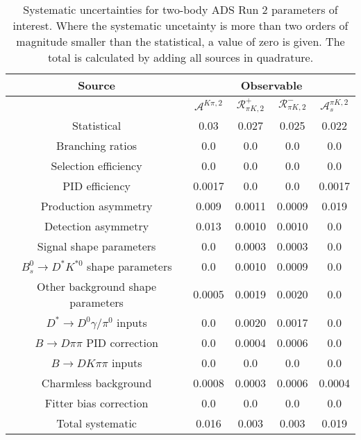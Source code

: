 \begin{sidewaystable}
  \centering
  \begin{tabular}{ccccc}
      \toprule
      Source & \multicolumn{4}{c}{Observable} \\
      \midrule
       & $\mathcal{A}^{K\pi,2}$ & $\mathcal{R}_{\pi K,2}^+$ & $\mathcal{R}_{\pi K,2}^-$ & $\mathcal{A}_s^{\pi K,2}$ \\
      \midrule
      Statistical & 0.03 & 0.027 & 0.025 & 0.022 \\
      \midrule
      Branching ratios & 0.0  & 0.0  & 0.0  & 0.0  \\
      Selection efficiency & 0.0  & 0.0  & 0.0  & 0.0  \\
      PID efficiency & 0.0017 & 0.0  & 0.0  & 0.0017 \\
      Production asymmetry & 0.009 & 0.0011 & 0.0009 & 0.019 \\
      Detection asymmetry & 0.013 & 0.0010 & 0.0010 & 0.0  \\
      Signal shape parameters & 0.0  & 0.0003 & 0.0003 & 0.0  \\
      $B^0_s \to D^* K^{*0}$ shape parameters & 0.0  & 0.0010 & 0.0009 & 0.0  \\
      Other background shape parameters & 0.0005 & 0.0019 & 0.0020 & 0.0  \\
      $D^* \to D^0 \gamma/\pi^0$ inputs & 0.0  & 0.0020 & 0.0017 & 0.0  \\
      $B\to D\pi\pi$ PID correction & 0.0  & 0.0004 & 0.0006 & 0.0  \\
      $B\to DK\pi\pi$ inputs & 0.0  & 0.0  & 0.0  & 0.0  \\
      Charmless background & 0.0008 & 0.0003 & 0.0006 & 0.0004 \\
      Fitter bias correction & 0.0  & 0.0  & 0.0  & 0.0  \\
      \midrule
      Total systematic & 0.016 & 0.003 & 0.003 & 0.019 \\
      \bottomrule
  \end{tabular}
  \caption{Systematic uncertainties for two-body ADS Run 2 parameters of interest. Where the systematic uncetainty is more than two orders of magnitude smaller than the statistical, a value of zero is given. The total is calculated by adding all sources in quadrature.}
\label{tab:twoBody_ADS_run2_systematics}
\end{sidewaystable}
